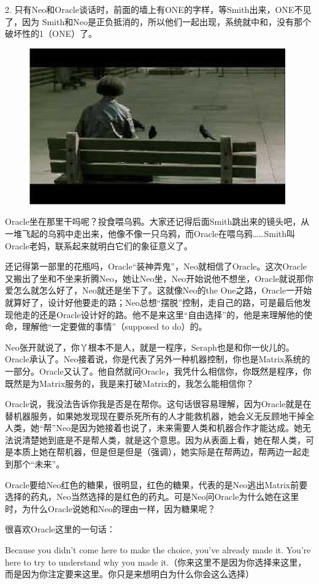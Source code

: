 \documentclass{ctexart}
\begin{document}
2. 只有Neo和Oracle谈话时，前面的墙上有ONE的字样，等Smith出来，ONE不见了，因为 Smith和Neo是正负抵消的，所以他们一起出现，系统就中和，没有那个破坏性的1（ONE）了。

\begin{figure}[htb]
\centering
\includegraphics[width=0.5\linewidth]{fig/read_reloaded-65}
\end{figure}

Oracle坐在那里干吗呢？投食喂乌鸦。大家还记得后面Smith跳出来的镜头吧，从一堆飞起的乌鸦中走出来，他像不像一只乌鸦，而Oracle在喂乌鸦……Smith叫Oracle老妈，联系起来就明白它们的象征意义了。

还记得第一部里的花瓶吗，Oracle“装神弄鬼”，Neo就相信了Oracle。这次Oracle又搬出了坐和不坐来折腾Neo，她让Neo坐，Neo开始说他不想坐，Oracle就说那你爱怎么就怎么好了，Neo就还是坐下了。这就像Neo的the One之路，Oracle一开始就算好了，设计好他要走的路；Neo总想“摆脱”控制，走自己的路，可是最后他发现他走的还是Oracle设计好的路。他不是来这里“自由选择”的，他是来理解他的使命，理解他“一定要做的事情”（supposed to do）的。

Neo张开就说了，你丫根本不是人，就是一程序，Seraph也是和你一伙儿的。Oracle承认了。Neo接着说，你是代表了另外一种机器控制，你也是Matrix系统的一部分。Oracle又认了。他自然就问Oracle，我凭什么相信你，你既然是程序，你既然是为Matrix服务的，我是来打破Matrix的，我怎么能相信你？

Oracle说，我没法告诉你我是否是在帮你。这句话很容易理解，因为Oracle就是在替机器服务，如果她发现现在要杀死所有的人才能救机器，她会义无反顾地干掉全人类，她“帮”Neo是因为她接着也说了，未来需要人类和机器合作才能达成。她无法说清楚她到底是不是帮人类，就是这个意思。因为从表面上看，她在帮人类，可是本质上她在帮机器，但是但是但是（强调），她实际是在帮两边，帮两边一起走到那个“未来”。

Oracle要给Neo红色的糖果，很明显，红色的糖果，代表的是Neo逃出Matrix前要选择的药丸，Neo当然选择的是红色的药丸。可是Neo问Oracle为什么她在这里时，为什么Oracle说她和Neo的理由一样，因为糖果呢？

很喜欢Oracle这里的一句话：

Because you didn't come here to make the choice, you've already made it. You're here to try to understand why you made it.（你来这里不是因为你选择来这里，而是因为你注定要来这里。你只是来想明白为什么你会这么选择）
\end{document}
